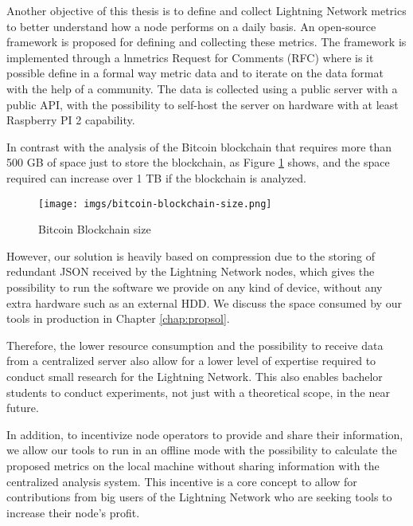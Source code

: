 Another objective of this thesis is to define and collect Lightning Network
metrics to better understand how a node performs on a daily basis. An open-source
framework is proposed for defining and collecting these metrics. The framework
is implemented through a lnmetrics Request for Comments (RFC) where is it possible define
in a formal way metric data and to iterate on the data format with the help of a community.
The data is collected using a public server with a public API, with the possibility to
self-host the server on hardware with at least Raspberry PI 2 capability.

In contrast with the analysis of the Bitcoin blockchain that requires more than
500 GB of space just to store the blockchain, as Figure \ref{fig:blockchain_size} shows,
and the space required can increase over 1 TB if the blockchain is analyzed.

\begin{figure}[h]
  \begin{center}
    \texttt{[image: imgs/bitcoin-blockchain-size.png]}
  \end{center}
  \caption{Bitcoin Blockchain size}
  \label{fig:blockchain_size}
\end{figure}

However, our solution is heavily based on compression due to the storing of redundant JSON received
by the Lightning Network nodes, which gives the possibility to run the software we provide on
any kind of device, without any extra hardware such as an external HDD. We discuss the space
consumed by our tools in production in Chapter \ref{chap:propsol}.

Therefore, the lower resource consumption and the possibility to receive data from a
centralized server also allow for a lower level of expertise required to conduct small
research for the Lightning Network. This also enables bachelor students to conduct
experiments, not just with a theoretical scope, in the near future.

In addition, to incentivize node operators to provide and share their information, we allow our
tools to run in an offline mode with the possibility to calculate the proposed metrics on the
local machine without sharing information with the centralized analysis system. This incentive
is a core concept to allow for contributions from big users of the Lightning Network who are
seeking tools to increase their node's profit.


